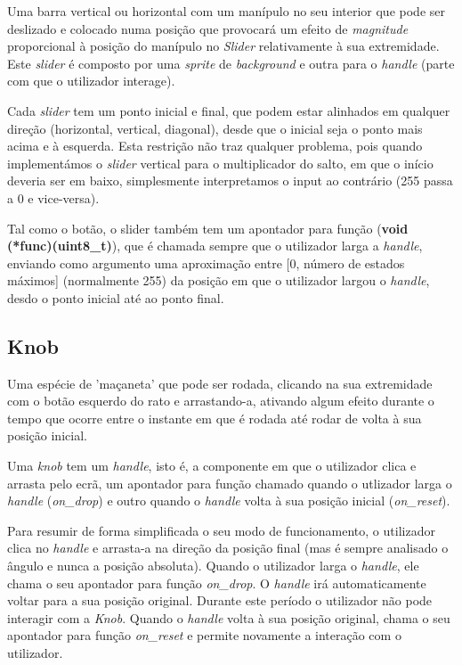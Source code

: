 \documentclass{report}
\begin{document}
Uma barra vertical ou horizontal com um manípulo no seu interior que pode ser deslizado e colocado numa posição que provocará um efeito de \textit{magnitude} proporcional à posição do manípulo no \textit{Slider} relativamente à sua extremidade. Este \textit{slider} é composto por uma \textit{sprite} de \textit{background} e outra para o \textit{handle} (parte com que o utilizador interage).

Cada \textit{slider} tem um ponto inicial e final, que podem estar alinhados em qualquer direção (horizontal, vertical, diagonal), desde que o inicial seja o ponto mais acima e à esquerda. Esta restrição não traz qualquer problema, pois quando implementámos o \textit{slider} vertical para o multiplicador do salto, em que o início deveria ser em baixo, simplesmente interpretamos o input ao contrário (255 passa a 0 e vice-versa).

Tal como o botão, o slider também tem um apontador para função (\textbf{void (*func)(uint8\_t)}), que é chamada sempre que o utilizador larga a \textit{handle}, enviando como argumento uma aproximação entre [0, número de estados máximos] (normalmente 255) da posição em que o utilizador largou o \textit{handle}, desdo o ponto inicial até ao ponto final.

\subsection{Knob}

Uma espécie de 'maçaneta' que pode ser rodada, clicando na sua extremidade com o botão esquerdo do rato e arrastando-a, ativando algum efeito durante o tempo que ocorre entre o instante em que é rodada até rodar de volta à sua posição inicial.

Uma \textit{knob} tem um \textit{handle}, isto é, a componente em que o utilizador clica e arrasta pelo ecrã, um apontador para função chamado quando o utlizador larga o \textit{handle} (\textit{on\_drop}) e outro quando o \textit{handle} volta à sua posição inicial (\textit{on\_reset}).

Para resumir de forma simplificada o seu modo de funcionamento, o utilizador clica no \textit{handle} e arrasta-a na direção da posição final (mas é sempre analisado o ângulo e nunca a posição absoluta). Quando o utilizador larga o \textit{handle}, ele chama o seu apontador para função \textit{on\_drop}. O \textit{handle} irá automaticamente voltar para a sua posição original. Durante este período o utilizador não pode interagir com a \textit{Knob}. Quando o \textit{handle} volta à sua posição original, chama o seu apontador para função \textit{on\_reset} e permite novamente a interação com o utilizador.
\end{document}

